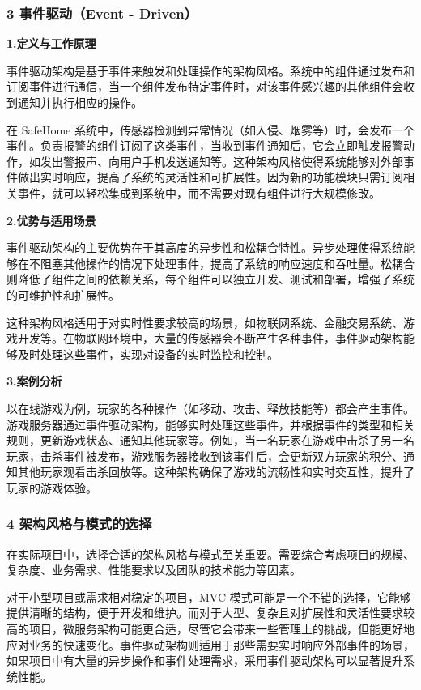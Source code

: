 \subsubsection{3 事件驱动（Event - Driven）}\label{ux4e8bux4ef6ux9a71ux52a8event---driven}

\textbf{1.定义与工作原理}

事件驱动架构是基于事件来触发和处理操作的架构风格。系统中的组件通过发布和订阅事件进行通信，当一个组件发布特定事件时，对该事件感兴趣的其他组件会收到通知并执行相应的操作。

在 SafeHome 系统中，传感器检测到异常情况（如入侵、烟雾等）时，会发布一个事件。负责报警的组件订阅了这类事件，当收到事件通知后，它会立即触发报警动作，如发出警报声、向用户手机发送通知等。这种架构风格使得系统能够对外部事件做出实时响应，提高了系统的灵活性和可扩展性。因为新的功能模块只需订阅相关事件，就可以轻松集成到系统中，而不需要对现有组件进行大规模修改。

\textbf{2.优势与适用场景}

事件驱动架构的主要优势在于其高度的异步性和松耦合特性。异步处理使得系统能够在不阻塞其他操作的情况下处理事件，提高了系统的响应速度和吞吐量。松耦合则降低了组件之间的依赖关系，每个组件可以独立开发、测试和部署，增强了系统的可维护性和扩展性。

这种架构风格适用于对实时性要求较高的场景，如物联网系统、金融交易系统、游戏开发等。在物联网环境中，大量的传感器会不断产生各种事件，事件驱动架构能够及时处理这些事件，实现对设备的实时监控和控制。

\textbf{3.案例分析}

以在线游戏为例，玩家的各种操作（如移动、攻击、释放技能等）都会产生事件。游戏服务器通过事件驱动架构，能够实时处理这些事件，并根据事件的类型和相关规则，更新游戏状态、通知其他玩家等。例如，当一名玩家在游戏中击杀了另一名玩家，击杀事件被发布，游戏服务器接收到该事件后，会更新双方玩家的积分、通知其他玩家观看击杀回放等。这种架构确保了游戏的流畅性和实时交互性，提升了玩家的游戏体验。

\subsubsection{4 架构风格与模式的选择}\label{ux67b6ux6784ux98ceux683cux4e0eux6a21ux5f0fux7684ux9009ux62e9}

在实际项目中，选择合适的架构风格与模式至关重要。需要综合考虑项目的规模、复杂度、业务需求、性能要求以及团队的技术能力等因素。

对于小型项目或需求相对稳定的项目，MVC 模式可能是一个不错的选择，它能够提供清晰的结构，便于开发和维护。而对于大型、复杂且对扩展性和灵活性要求较高的项目，微服务架构可能更合适，尽管它会带来一些管理上的挑战，但能更好地应对业务的快速变化。事件驱动架构则适用于那些需要实时响应外部事件的场景，如果项目中有大量的异步操作和事件处理需求，采用事件驱动架构可以显著提升系统性能。

